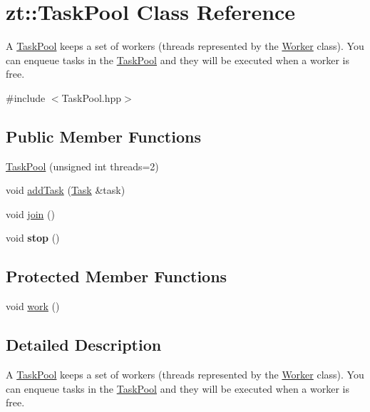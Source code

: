 \hypertarget{classzt_1_1_task_pool}{}\section{zt\+:\+:Task\+Pool Class Reference}
\label{classzt_1_1_task_pool}


A \hyperlink{classzt_1_1_task_pool}{Task\+Pool} keeps a set of workers (threads represented by the \hyperlink{classzt_1_1_worker}{Worker} class). You can enqueue tasks in the \hyperlink{classzt_1_1_task_pool}{Task\+Pool} and they will be executed when a worker is free.  




{\ttfamily \#include $<$Task\+Pool.\+hpp$>$}

\subsection*{Public Member Functions}
\begin{DoxyCompactItemize}
\item 
\hyperlink{classzt_1_1_task_pool_a20b14ff66aaf67a035dd7394e7266ee0}{Task\+Pool} (unsigned int threads=2)
\item 
void \hyperlink{classzt_1_1_task_pool_a966bbcbfbc550c1324772d90c1c70f1b}{add\+Task} (\hyperlink{classzt_1_1_task}{Task} \&task)
\item 
void \hyperlink{classzt_1_1_task_pool_a39276f6d847af21e7c6eff52a4712fea}{join} ()
\item 
\mbox{\label{classzt_1_1_task_pool_ad9e5feffedd371d5ef1f0bfce8cef5c4}} 
void {\bfseries stop} ()
\end{DoxyCompactItemize}
\subsection*{Protected Member Functions}
\begin{DoxyCompactItemize}
\item 
void \hyperlink{classzt_1_1_task_pool_a1b03b3bf318d4873e9109cd6c9ba43b4}{work} ()
\end{DoxyCompactItemize}


\subsection{Detailed Description}
A \hyperlink{classzt_1_1_task_pool}{Task\+Pool} keeps a set of workers (threads represented by the \hyperlink{classzt_1_1_worker}{Worker} class). You can enqueue tasks in the \hyperlink{classzt_1_1_task_pool}{Task\+Pool} and they will be executed when a worker is free. 

